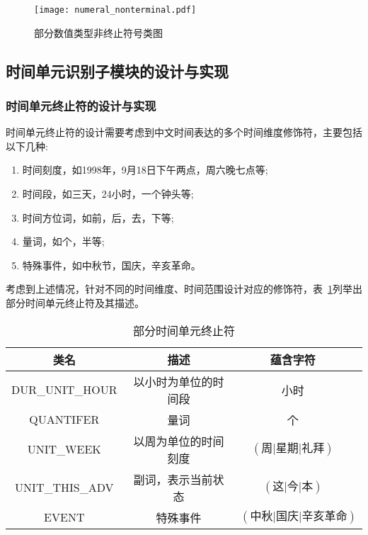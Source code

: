 \begin{figure}[h]
    \centering
    \texttt{[image: numeral\_nonterminal.pdf]}
    \caption{部分数值类型非终止符号类图}
    \label{fig:numeral_nonterminal}
\end{figure}

\subsection{时间单元识别子模块的设计与实现}

\subsubsection{时间单元终止符的设计与实现}

时间单元终止符的设计需要考虑到中文时间表达的多个时间维度修饰符，主要包括以下几种:
\begin{enumerate}
    \item[(1)] 时间刻度，如1998年，9月18日下午两点，周六晚七点等;
    \item[(2)] 时间段，如三天，24小时，一个钟头等;
    \item[(3)] 时间方位词，如前，后，去，下等;
    \item[(4)] 量词，如个，半等;
    \item[(5)] 特殊事件，如中秋节，国庆，辛亥革命。
\end{enumerate}

考虑到上述情况，针对不同的时间维度、时间范围设计对应的修饰符，表~\ref{tab:date_terminal}列举出部分时间单元终止符及其描述。

\begin{table}[h]
    \centering
    \caption{部分时间单元终止符}
    \begin{tabular}{*{4}{c}}
        \toprule
        类名            & 描述                 & 蕴含字符                                 \\
        \midrule
        DUR\_UNIT\_HOUR & 以小时为单位的时间段 & 小时                                     \\
        QUANTIFER       & 量词                 & 个                                       \\
        UNIT\_WEEK      & 以周为单位的时间刻度 & $\left(\text{周|星期|礼拜}\right)$       \\
        UNIT\_THIS\_ADV & 副词，表示当前状态   & $\left(\text{这|今|本}\right)$           \\
        EVENT           & 特殊事件             & $\left(\text{中秋|国庆|辛亥革命}\right)$ \\
        \bottomrule
    \end{tabular}
    \label{tab:date_terminal}
\end{table}

